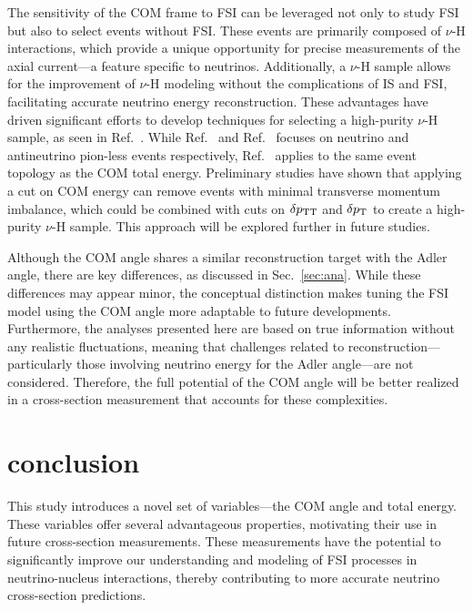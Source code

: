 The sensitivity of the COM frame to FSI can be leveraged not only to study FSI but also to select events without FSI. 
These events are primarily composed of $\nu$-H interactions, which provide a unique opportunity for precise measurements of the axial current—a feature specific to neutrinos. 
Additionally, a $\nu$-H sample allows for the improvement of $\nu$-H modeling without the complications of IS and FSI, facilitating accurate neutrino energy reconstruction. 
These advantages have driven significant efforts to develop techniques for selecting a high-purity $\nu$-H sample, as seen in Ref.~\cite{Lu:2015hea,MINERvA:2023avz,Baudis:2023tma}.
While Ref.~\cite{Baudis:2023tma} and Ref.~\cite{MINERvA:2023avz} focuses on neutrino and antineutrino pion-less events respectively, Ref.~\cite{Lu:2015hea} applies to the same event topology as the COM total energy. 
Preliminary studies have shown that applying a cut on COM energy can remove events with minimal transverse momentum imbalance, which could be combined with cuts on $\delta p_\textrm{TT}$ and $\delta p_\textrm{T}$ to create a high-purity $\nu$-H sample. 
This approach will be explored further in future studies.

Although the COM angle shares a similar reconstruction target with the Adler angle, there are key differences, as discussed in Sec.~\ref{sec:ana}. 
While these differences may appear minor, the conceptual distinction makes tuning the FSI model using the COM angle more adaptable to future developments. 
Furthermore, the analyses presented here are based on true information without any realistic fluctuations, meaning that challenges related to reconstruction—particularly those involving neutrino energy for the Adler angle—are not considered. 
Therefore, the full potential of the COM angle will be better realized in a cross-section measurement that accounts for these complexities.

\section{conclusion}
This study introduces a novel set of variables—the COM angle and total energy.
These variables offer several advantageous properties, motivating their use in future cross-section measurements.
These measurements have the potential to significantly improve our understanding and modeling of FSI processes in neutrino-nucleus interactions, thereby contributing to more accurate neutrino cross-section predictions.


\minitoc